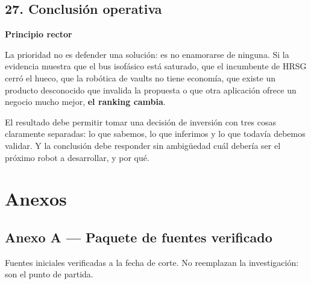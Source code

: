 \documentclass[11pt,a4paper]{article}
\newenvironment{notaclave}[1]
  {\begin{notaclavebase}{\sffamily\scriptsize\bfseries\color{amber}#1}\par\vspace{2pt}}
  {\end{notaclavebase}}
\begin{document}
\subsection*{27. Conclusión operativa}

\begin{notaclave}{Principio rector}
La prioridad no es defender una solución: es no enamorarse de ninguna. Si la evidencia muestra que el bus isofásico está saturado, que el incumbente de HRSG cerró el hueco, que la robótica de vaults no tiene economía, que existe un producto desconocido que invalida la propuesta o que otra aplicación ofrece un negocio mucho mejor, \textbf{el ranking cambia}.

\end{notaclave}
El resultado debe permitir tomar una decisión de inversión con tres cosas claramente separadas: lo que sabemos, lo que inferimos y lo que todavía debemos validar. Y la conclusión debe responder sin ambigüedad cuál debería ser el próximo robot a desarrollar, y por qué.

\clearpage

\section*{Anexos}


\subsection*{Anexo A — Paquete de fuentes verificado}

Fuentes iniciales verificadas a la fecha de corte. No reemplazan la investigación: son el punto de partida.
\end{document}

